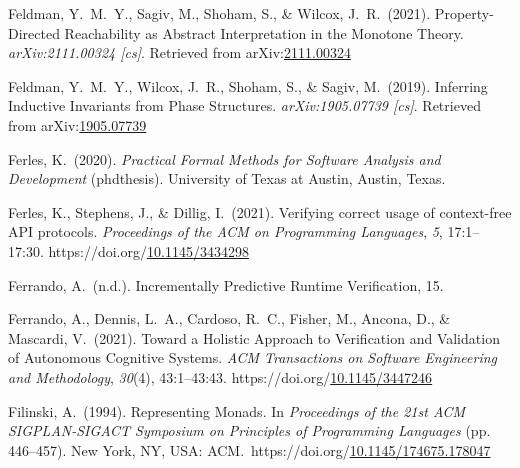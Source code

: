 \documentclass[12pt,twoside]{article}
\begin{document}
{\begin{thebibliography}{1079}
\mdbibitemlabel{}Feldman, Y.~M.~Y., Sagiv, M., Shoham, S., \& Wilcox, J.~R.~(2021). Property-Directed Reachability as Abstract Interpretation in the Monotone Theory. \emph{arXiv:2111.00324 {}[cs]}. Retrieved from arXiv:\href{http://arxiv.org/abs/2111.00324}{2111.00324}%

\mdbibitemlabel{}Feldman, Y.~M.~Y., Wilcox, J.~R., Shoham, S., \& Sagiv, M.~(2019). Inferring Inductive Invariants from Phase Structures. \emph{arXiv:1905.07739 {}[cs]}. Retrieved from arXiv:\href{http://arxiv.org/abs/1905.07739}{1905.07739}%

\mdbibitemlabel{}Ferles, K.~(2020). \emph{Practical Formal Methods for Software Analysis and Development} (phdthesis). University of Texas at Austin, Austin, Texas.%

\mdbibitemlabel{}Ferles, K., Stephens, J., \& Dillig, I.~(2021). Verifying correct usage of context-free API protocols. \emph{Proceedings of the ACM on Programming Languages}, \emph{5}, 17:1–17:30. https://doi.org/\href{https://dx.doi.org/10.1145/3434298}{10.1145/3434298}%

\mdbibitemlabel{}Ferrando, A.~(n.d.). Incrementally Predictive Runtime Veriﬁcation, 15.%

\mdbibitemlabel{}Ferrando, A., Dennis, L.~A., Cardoso, R.~C., Fisher, M., Ancona, D., \& Mascardi, V.~(2021). Toward a Holistic Approach to Verification and Validation of Autonomous Cognitive Systems. \emph{ACM Transactions on Software Engineering and Methodology}, \emph{30}(4), 43:1–43:43. https://doi.org/\href{https://dx.doi.org/10.1145/3447246}{10.1145/3447246}%

\mdbibitemlabel{}Filinski, A.~(1994). Representing Monads. In \emph{Proceedings of the 21st ACM SIGPLAN-SIGACT Symposium on Principles of Programming Languages} (pp. 446–457). New York, NY, USA: ACM.~https://doi.org/\href{https://dx.doi.org/10.1145/174675.178047}{10.1145/174675.178047}%


\end{thebibliography}}
\end{document}
